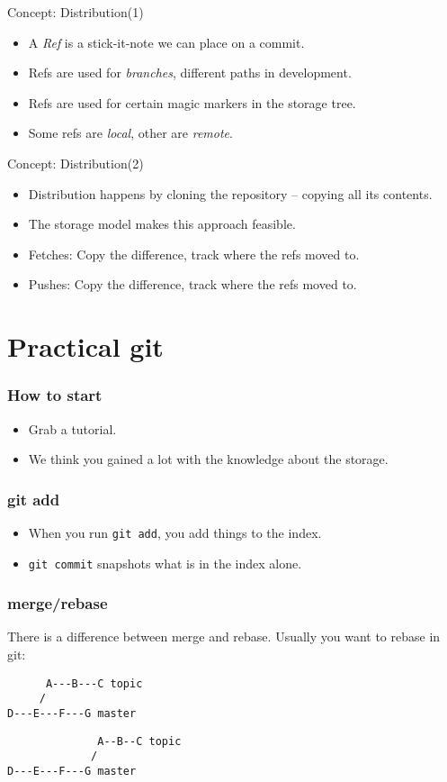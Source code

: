 \documentclass[xcolor=pdftex,dvipsnames]{beamer}
\begin{document}
\begin{frame}{Concept: Distribution(1)}
  \begin{itemize}
  \item A \emph{Ref} is a stick-it-note we can place on a commit.
  \item Refs are used for \emph{branches}, different paths in development.
  \item Refs are used for certain magic markers in the storage tree.
  \item Some refs are \emph{local}, other are \emph{remote}.
  \end{itemize}
\end{frame}
\begin{frame}{Concept: Distribution(2)}
  \begin{itemize}
  \item Distribution happens by cloning the repository -- copying all
    its contents.
  \item The storage model makes this approach feasible.
  \item Fetches: Copy the difference, track where the refs moved to.
  \item Pushes:  Copy the difference, track where the refs moved to.
  \end{itemize}
\end{frame}

\section{Practical git}
\begin{frame}
  \frametitle{How to start}
  \begin{itemize}
  \item Grab a tutorial.
  \item We think you gained a lot with the knowledge about the
    storage.
  \end{itemize}
\end{frame}

\begin{frame}
  \frametitle{git add}
  \begin{itemize}
  \item When you run \texttt{git add}, you add things to the index.
  \item \texttt{git commit} snapshots what is in the index alone.
  \end{itemize}
\end{frame}

\begin{frame}[fragile]
  \frametitle{merge/rebase}
  There is a difference between merge and rebase. Usually you want to
  rebase in git:
\begin{verbatim}
      A---B---C topic
     /
D---E---F---G master
\end{verbatim}
\begin{verbatim}
              A--B--C topic
             /
D---E---F---G master
 \end{verbatim}
\end{frame}
\end{document}
